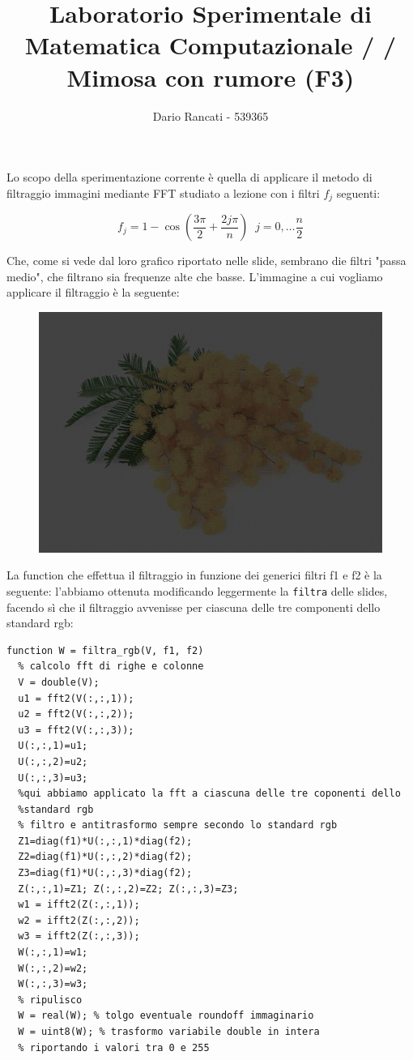 \documentclass{article}
\title{\textbf{Laboratorio Sperimentale di Matematica Computazionale / / Mimosa con rumore (F3)}}
\author{Dario Rancati - 539365}
\begin{document}
\maketitle

\noindent
Lo scopo della sperimentazione corrente è quella di applicare il metodo di filtraggio immagini mediante FFT studiato a lezione con 
i filtri $f_{j}$ seguenti:

$$f_{j}= 1 - \cos{\left( \frac{3\pi}{2}+\frac{2j\pi}{n} \right)} \; \; j = 0, \ldots \frac{n}{2}$$

\noindent

Che, come si vede dal loro grafico riportato nelle slide, sembrano die filtri "passa medio", che filtrano sia frequenze alte che basse. L'immagine a cui vogliamo applicare il filtraggio è la seguente:

\begin{figure}[!h]
\centering
\includegraphics[width=\textwidth]{mimosar.jpg}
\end{figure}

\noindent
La function che effettua il filtraggio in funzione dei generici filtri f1 e f2 è la seguente: l'abbiamo ottenuta modificando leggermente la \texttt{filtra} delle slides, facendo sì che il filtraggio avvenisse per ciascuna delle tre componenti dello standard rgb:

\begin{lstlisting}
function W = filtra_rgb(V, f1, f2)
  % calcolo fft di righe e colonne
  V = double(V); 
  u1 = fft2(V(:,:,1));
  u2 = fft2(V(:,:,2));
  u3 = fft2(V(:,:,3));
  U(:,:,1)=u1; 
  U(:,:,2)=u2; 
  U(:,:,3)=u3;
  %qui abbiamo applicato la fft a ciascuna delle tre coponenti dello
  %standard rgb
  % filtro e antitrasformo sempre secondo lo standard rgb
  Z1=diag(f1)*U(:,:,1)*diag(f2);
  Z2=diag(f1)*U(:,:,2)*diag(f2);
  Z3=diag(f1)*U(:,:,3)*diag(f2);
  Z(:,:,1)=Z1; Z(:,:,2)=Z2; Z(:,:,3)=Z3;
  w1 = ifft2(Z(:,:,1));
  w2 = ifft2(Z(:,:,2));
  w3 = ifft2(Z(:,:,3));
  W(:,:,1)=w1;
  W(:,:,2)=w2; 
  W(:,:,3)=w3;
  % ripulisco
  W = real(W); % tolgo eventuale roundoff immaginario
  W = uint8(W); % trasformo variabile double in intera
  % riportando i valori tra 0 e 255
\end{lstlisting}
\end{document}
